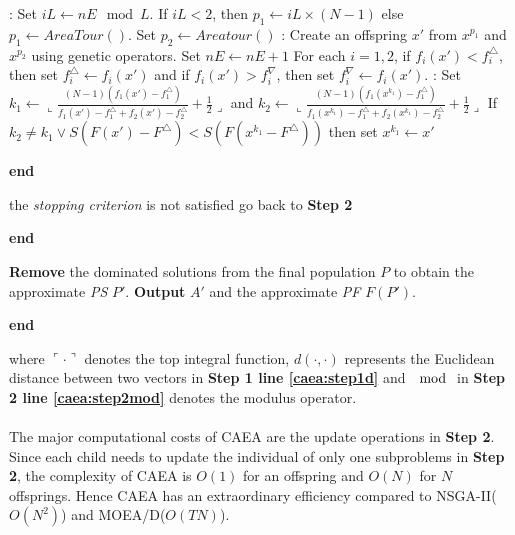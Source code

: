 \documentclass[a4paper, 11pt]{article}
\renewcommand{\End}{\kill\addtocounter{indent}{-1}\liprint\textbf{end} }
\begin{document}
\begin{codebox}
 \label{caea:step2}
\li \Do
\li     {}:
\li     Set $iL\gets nE\mod L$. \label{caea:step2mod}
\li     If $iL<2$, then $p_1\gets iL\times(N-1)$ else $p_1\gets AreaTour()$.
\li      Set $p_2\gets Areatour()$
\li
\li     {}:
\li     Create an offspring $x'$ from $x^{p_1}$ and $x^{p_2}$
\li     using genetic operators.
\li     Set $nE \gets nE+1$
\li
\li     {}
\li     For each $i=1,2$, if $f_i(x')<f^\triangle_i$,
\li     then set $f^\triangle_i\gets f_i(x')$ and
\li     if $f_i(x')>f^\nabla_i$,
\li     then set $f^\nabla_i\gets f_i(x')$.
\li
\li     {}:
\li     Set $k_1\gets\llcorner\frac{(N-1)(f_1(x')-f^\triangle_1)}{f_1(x')-f^\triangle_1+f_2(x')-f^\triangle_2}+\frac{1}{2}\lrcorner$
\li     and $k_2\gets\llcorner\frac{(N-1)(f_1(x^{k_1})-f^\triangle_1)}{f_1(x^{k_1})-f^\triangle_1+f_2(x^{k_1})-f^\triangle_2}+\frac{1}{2}\lrcorner$
\li
\li     If $k_2\neq k_1\vee S(F(x')-F^\triangle)<S(F(x^{k_1}-F^\triangle))$
\li     then set $x^{k_1}\gets x'$
\li \End
\end{codebox}

\begin{codebox}
\li \If the \emph{stopping criterion} is not satisfied
\li     \Then go back to \textbf{Step 2}
\li     \End
\end{codebox}

\begin{codebox}
\li \Do
\li     \textbf{Remove} the dominated solutions from
\li     the final population $P$ to obtain the approximate \emph{PS} $P'$.
\li
\li     \textbf{Output} $A'$ and the approximate \emph{PF} $F(P')$.
\li \End
\end{codebox}
where $\ulcorner\cdot\urcorner$ denotes the top integral function,
$d(\cdot,\cdot)$ represents the Euclidean distance between two vectors in \textbf{Step 1 line \ref{caea:step1d}} and $\mod$ in \textbf{Step 2 line \ref{caea:step2mod}} denotes the modulus operator.\\
\\
The major computational costs of CAEA are the update operations in \textbf{Step 2}. Since each child needs to update the individual of only one subproblems in \textbf{Step 2}, the complexity of CAEA is $O(1)$ for an offspring and $O(N)$ for $N$ offsprings. Hence CAEA has an extraordinary efficiency compared to NSGA-II($O(N^2)$) and MOEA/D($O(TN)$).
\end{document}

